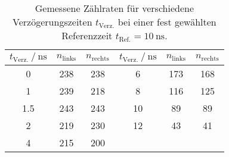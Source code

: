 \begin{table}
\centering
\caption{Gemessene Zählraten für verschiedene Verzögerungszeiten $t_\text{Verz.}$ bei einer fest gewählten
Referenzzeit $t_\text{Ref.} = \SI{10}{\nano\second}$.}
\begin{tabular}{c c c | c c c}
\toprule
\multicolumn{1}{c}{$t_\text{Verz.} \:/\: \si{\nano\second}$} & \multicolumn{1}{c}{$n_\text{links}$}
& \multicolumn{1}{c}{$n_\text{rechts}$} & \multicolumn{1}{c}{$t_\text{Verz.} \:/\: \si{\nano\second}$}
& \multicolumn{1}{c}{$n_\text{links}$} & \multicolumn{1}{c}{$n_\text{rechts}$}  \\
\midrule
0   & 238 & 238 & 6   & 173 & 168 \\
1   & 239 & 218 & 8   & 116 & 125 \\
1.5 & 243 & 243 & 10  & 89  & 89  \\
2   & 219 & 230 & 12  & 43  & 41  \\
4   & 215 & 200 \\
\bottomrule
\end{tabular}
\label{tabular_01}
\end{table}
